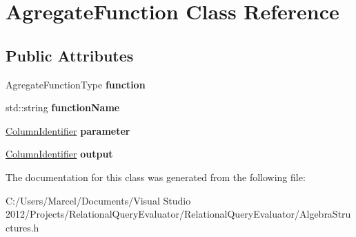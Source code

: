 \hypertarget{class_agregate_function}{\section{Agregate\+Function Class Reference}
\label{class_agregate_function}
}
\subsection*{Public Attributes}
\begin{DoxyCompactItemize}
\item 
\hypertarget{class_agregate_function_afc2ef5318021e8fa5aac765f48cc2561}{Agregate\+Function\+Type {\bfseries function}}\label{class_agregate_function_afc2ef5318021e8fa5aac765f48cc2561}

\item 
\hypertarget{class_agregate_function_a06046f10f3072c4ef6300b51f283ed3f}{std\+::string {\bfseries function\+Name}}\label{class_agregate_function_a06046f10f3072c4ef6300b51f283ed3f}

\item 
\hypertarget{class_agregate_function_ad37427d3dee4bc5dc7a76d5997bb22fc}{\hyperlink{class_column_identifier}{Column\+Identifier} {\bfseries parameter}}\label{class_agregate_function_ad37427d3dee4bc5dc7a76d5997bb22fc}

\item 
\hypertarget{class_agregate_function_ae78c0ff39b17f1d341f89c6660d7f448}{\hyperlink{class_column_identifier}{Column\+Identifier} {\bfseries output}}\label{class_agregate_function_ae78c0ff39b17f1d341f89c6660d7f448}

\end{DoxyCompactItemize}


The documentation for this class was generated from the following file\+:\begin{DoxyCompactItemize}
\item 
C\+:/\+Users/\+Marcel/\+Documents/\+Visual Studio 2012/\+Projects/\+Relational\+Query\+Evaluator/\+Relational\+Query\+Evaluator/Algebra\+Structures.\+h\end{DoxyCompactItemize}
